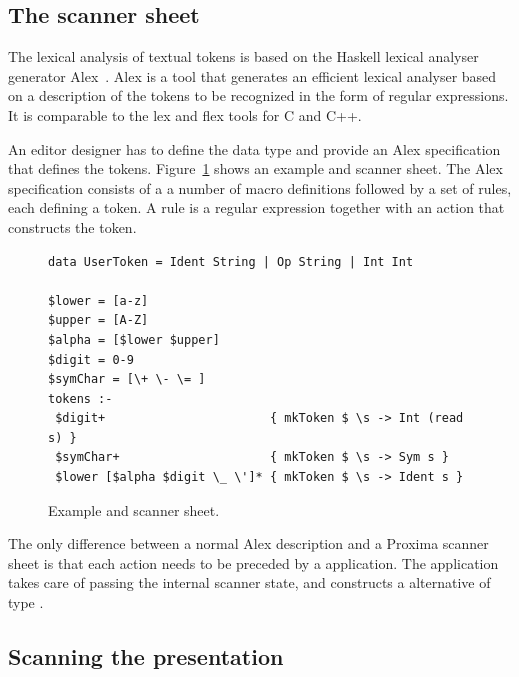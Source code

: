 \documentclass[12pt]{article}
\begin{document}

\subsection{The scanner sheet}

The lexical analysis of textual tokens is based on the Haskell lexical analyser generator Alex~\cite{marlow07alex}. Alex is a tool that generates an efficient lexical analyser based on a description of the tokens to be recognized in the form of regular expressions. It is comparable to the lex and flex tools for C and C++.

An editor designer has to define the data type  and provide an Alex specification that defines the tokens. Figure~\ref{fig:scannerSheet} shows an example  and scanner sheet. The Alex specification consists of a a number of macro definitions followed by a set of rules, each defining a token. A rule is a regular expression together with an action that constructs the token.

\begin{figure}
\begin{center}
\begin{footnotesize}
\begin{verbatim}
data UserToken = Ident String | Op String | Int Int

$lower = [a-z]
$upper = [A-Z]
$alpha = [$lower $upper]
$digit = 0-9		
$symChar = [\+ \- \= ]
tokens :-
 $digit+                       { mkToken $ \s -> Int (read s) }
 $symChar+                     { mkToken $ \s -> Sym s }
 $lower [$alpha $digit \_ \']* { mkToken $ \s -> Ident s }
\end{verbatim} %
\end{footnotesize}
\caption{Example  and scanner sheet.} \label{fig:scannerSheet} 
\end{center}
\end{figure}

The only difference between a normal Alex description and a Proxima scanner sheet is that each action needs to be preceded by a  application. The  application takes care of passing the internal scanner state, and constructs a  alternative of type . 



\subsection{Scanning the presentation}
\end{document}
